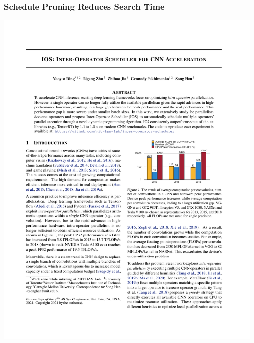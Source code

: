 \documentclass[12pt,aspectratio=169]{beamer}
\begin{document}
    \begin{frame}
        \frametitle{Schedule Pruning Reduces Search Time}

        \begin{center}
            \includegraphics[page=9,trim=1.8cm 10.7cm 11cm 11.2cm,clip,scale=1]{paper.pdf}
        \end{center}
    \end{frame}
\end{document}
